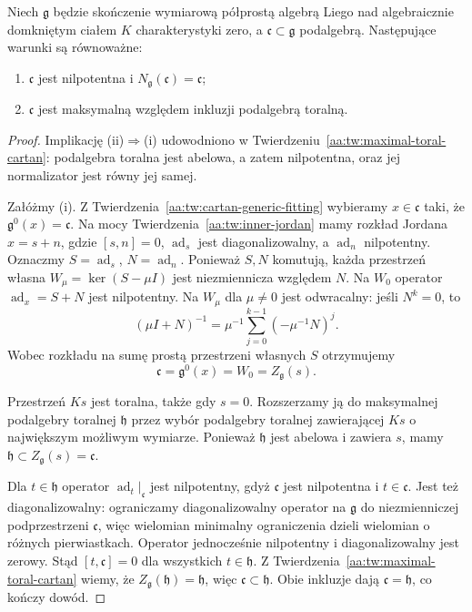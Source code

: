 \begin{twierdzenie}
\label{aa:tw:cartan-toral-equivalence}
Niech $\mathfrak g$ będzie skończenie wymiarową półprostą algebrą Liego nad algebraicznie domkniętym ciałem $K$ charakterystyki zero, a $\mathfrak c\subset\mathfrak g$ podalgebrą. Następujące warunki są równoważne:
\begin{enumerate}[label=(\roman*)]
 \item $\mathfrak c$ jest nilpotentna i $N_{\mathfrak g}(\mathfrak c)=\mathfrak c$;
 \item $\mathfrak c$ jest maksymalną względem inkluzji podalgebrą toralną.
\end{enumerate}
\end{twierdzenie}
\begin{proof}
Implikację (ii)$\Rightarrow$(i) udowodniono w Twierdzeniu~\ref{aa:tw:maximal-toral-cartan}: podalgebra toralna jest abelowa, a zatem nilpotentna, oraz jej normalizator jest równy jej samej.

Załóżmy (i). Z Twierdzenia~\ref{aa:tw:cartan-generic-fitting} wybieramy $x\in\mathfrak c$ taki, że $\mathfrak g^0(x)=\mathfrak c$. Na mocy Twierdzenia~\ref{aa:tw:inner-jordan} mamy rozkład Jordana $x=s+n$, gdzie $[s,n]=0$, $\operatorname{ad}_s$ jest diagonalizowalny, a $\operatorname{ad}_n$ nilpotentny. Oznaczmy $S=\operatorname{ad}_s$, $N=\operatorname{ad}_n$. Ponieważ $S,N$ komutują, każda przestrzeń własna $W_\mu=\ker(S-\mu I)$ jest niezmiennicza względem $N$. Na $W_0$ operator $\operatorname{ad}_x=S+N$ jest nilpotentny. Na $W_\mu$ dla $\mu\ne0$ jest odwracalny: jeśli $N^k=0$, to
\[
 (\mu I+N)^{-1}=\mu^{-1}\sum_{j=0}^{k-1}(-\mu^{-1}N)^j.
\]
Wobec rozkładu na sumę prostą przestrzeni własnych $S$ otrzymujemy
\[
 \mathfrak c=\mathfrak g^0(x)=W_0=Z_{\mathfrak g}(s).
\]

Przestrzeń $Ks$ jest toralna, także gdy $s=0$. Rozszerzamy ją do maksymalnej podalgebry toralnej $\mathfrak h$ przez wybór podalgebry toralnej zawierającej $Ks$ o największym możliwym wymiarze. Ponieważ $\mathfrak h$ jest abelowa i zawiera $s$, mamy $\mathfrak h\subset Z_{\mathfrak g}(s)=\mathfrak c$.

Dla $t\in\mathfrak h$ operator $\operatorname{ad}_t|_{\mathfrak c}$ jest nilpotentny, gdyż $\mathfrak c$ jest nilpotentna i $t\in\mathfrak c$. Jest też diagonalizowalny: ograniczamy diagonalizowalny operator na $\mathfrak g$ do niezmienniczej podprzestrzeni $\mathfrak c$, więc wielomian minimalny ograniczenia dzieli wielomian o różnych pierwiastkach. Operator jednocześnie nilpotentny i diagonalizowalny jest zerowy. Stąd $[t,\mathfrak c]=0$ dla wszystkich $t\in\mathfrak h$. Z Twierdzenia~\ref{aa:tw:maximal-toral-cartan} wiemy, że $Z_{\mathfrak g}(\mathfrak h)=\mathfrak h$, więc $\mathfrak c\subset\mathfrak h$. Obie inkluzje dają $\mathfrak c=\mathfrak h$, co kończy dowód.
\end{proof}

